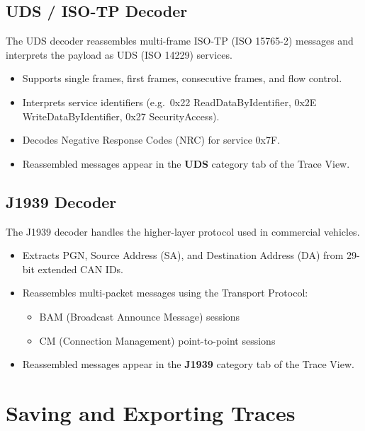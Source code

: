 \documentclass[a4paper,11pt]{article}
\newcommand{\ui}[1]{\textbf{#1}}
\begin{document}
\subsection{UDS / ISO-TP Decoder}

The UDS decoder reassembles multi-frame ISO-TP (ISO 15765-2) messages and
interprets the payload as UDS (ISO 14229) services.

\begin{itemize}
  \item Supports single frames, first frames, consecutive frames, and flow control.
  \item Interprets service identifiers (e.g.\ 0x22 ReadDataByIdentifier,
        0x2E WriteDataByIdentifier, 0x27 SecurityAccess).
  \item Decodes Negative Response Codes (NRC) for service 0x7F.
  \item Reassembled messages appear in the \ui{UDS} category tab of the Trace View.
\end{itemize}

\subsection{J1939 Decoder}

The J1939 decoder handles the higher-layer protocol used in commercial vehicles.

\begin{itemize}
  \item Extracts PGN, Source Address (SA), and Destination Address (DA) from
        29-bit extended CAN IDs.
  \item Reassembles multi-packet messages using the Transport Protocol:
    \begin{itemize}
      \item BAM (Broadcast Announce Message) sessions
      \item CM (Connection Management) point-to-point sessions
    \end{itemize}
  \item Reassembled messages appear in the \ui{J1939} category tab of the Trace View.
\end{itemize}

\section{Saving and Exporting Traces}
\end{document}
